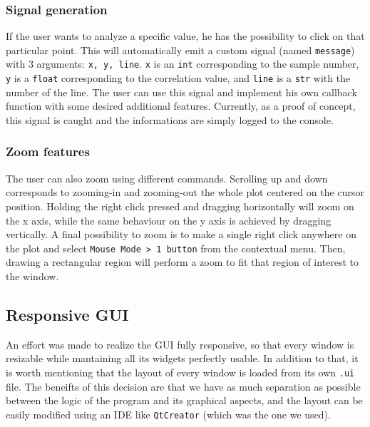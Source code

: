 \documentclass[11pt,a4paper]{article}
\begin{document}
\subsubsection{Signal generation}
If the user wants to analyze a specific value, he has the possibility to click on that particular point. This will automatically emit a custom signal (named \texttt{message}) with 3 arguments: \texttt{x, y, line}. \texttt{x} is an \texttt{int} corresponding to the sample number, \texttt{y} is a \texttt{float} corresponding to the correlation value, and \texttt{line} is a \texttt{str} with the number of the line. The user can use this signal and implement his own callback function with some desired additional features. Currently, as a proof of concept, this signal is caught and the informations are simply logged to the console.

\subsubsection{Zoom features}
The user can also zoom using different commands. Scrolling up and down corresponds to zooming-in and zooming-out the whole plot centered on the cursor position. Holding the right click pressed and dragging horizontally will zoom on the x axis, while the same behaviour on the y axis is achieved by dragging vertically. A final possibility to zoom is to make a single right click anywhere on the plot and select \texttt{Mouse Mode > 1 button} from the contextual menu. Then, drawing a rectangular region will perform a zoom to fit that region of interest to the window.

\subsection{Responsive GUI}
An effort was made to realize the GUI fully responsive, so that every window is resizable while mantaining all its widgets perfectly usable. In addition to that, it is worth mentioning that the layout of every window is loaded from its own \texttt{.ui} file. The beneifts of this decision are that we have as much separation as possible between the logic of the program and its graphical aspects, and the layout can be easily modified using an IDE like \texttt{QtCreator} (which was the one we used).
\end{document}
